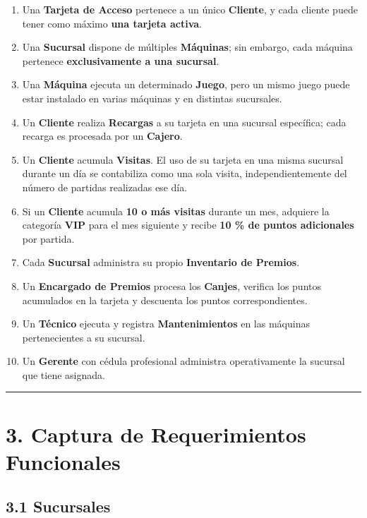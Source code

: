 \documentclass[12pt,a4paper]{article}
\begin{document}
\begin{enumerate}
    \item Una \textbf{Tarjeta de Acceso} pertenece a un único \textbf{Cliente}, y cada cliente puede tener como máximo \textbf{una tarjeta activa}.
    \item Una \textbf{Sucursal} dispone de múltiples \textbf{Máquinas}; sin embargo, cada máquina pertenece \textbf{exclusivamente a una sucursal}.
    \item Una \textbf{Máquina} ejecuta un determinado \textbf{Juego}, pero un mismo juego puede estar instalado en varias máquinas y en distintas sucursales.
    \item Un \textbf{Cliente} realiza \textbf{Recargas} a su tarjeta en una sucursal específica; cada recarga es procesada por un \textbf{Cajero}.
    \item Un \textbf{Cliente} acumula \textbf{Visitas}. El uso de su tarjeta en una misma sucursal durante un día se contabiliza como una sola visita, independientemente del número de partidas realizadas ese día.
    \item Si un \textbf{Cliente} acumula \textbf{10 o más visitas} durante un mes, adquiere la categoría \textbf{VIP} para el mes siguiente y recibe \textbf{10 \% de puntos adicionales} por partida.
    \item Cada \textbf{Sucursal} administra su propio \textbf{Inventario de Premios}.
    \item Un \textbf{Encargado de Premios} procesa los \textbf{Canjes}, verifica los puntos acumulados en la tarjeta y descuenta los puntos correspondientes.
    \item Un \textbf{Técnico} ejecuta y registra \textbf{Mantenimientos} en las máquinas pertenecientes a su sucursal.
    \item Un \textbf{Gerente} con cédula profesional administra operativamente la sucursal que tiene asignada.
\end{enumerate}

\vspace{1em}
\noindent\rule{\textwidth}{0.4pt}
\vspace{1em}

\section*{3. Captura de Requerimientos Funcionales}

\subsection*{3.1 Sucursales}
\end{document}
